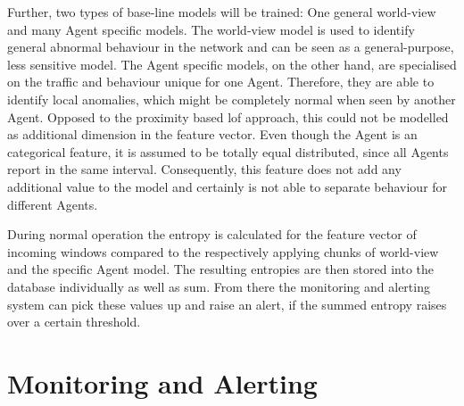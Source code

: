 Further, two types of base-line models will be trained: One general world-view and many Agent specific models.
The world-view model is used to identify general abnormal behaviour in the network and can be seen as a general-purpose, less sensitive model.
The Agent specific models, on the other hand, are specialised on the traffic and behaviour unique for one Agent. Therefore, they are able to identify local anomalies, which might be completely normal when seen by another Agent.
Opposed to the proximity based \gls{lof} approach, this could not be modelled as additional dimension in the feature vector.
Even though the Agent is an categorical feature, it is assumed to be totally equal distributed, since all Agents report in the same interval.
Consequently, this feature does not add any additional value to the model and certainly is not able to separate behaviour for different Agents.

During normal operation the entropy is calculated for the feature vector of incoming windows compared to the respectively applying chunks of world-view and the specific Agent model.
The resulting entropies are then stored into the database individually as well as sum. From there the monitoring and alerting system can pick these values up and raise an alert, if the summed entropy raises over a certain threshold.

\section{Monitoring and Alerting}
\label{sec:concept:mon}

